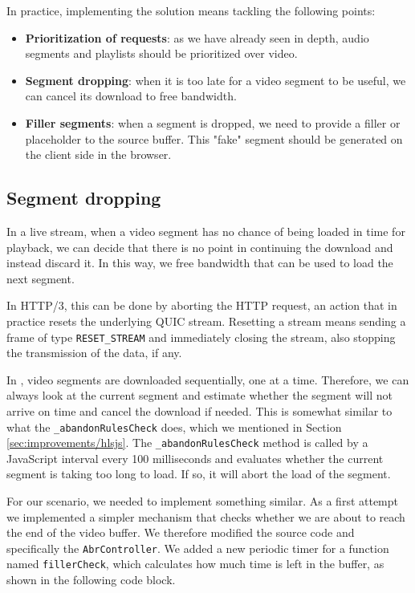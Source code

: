In practice, implementing the solution means tackling the following points:

\begin{itemize}
    \item \textbf{Prioritization of requests}: as we have already seen in depth, audio segments and playlists should be prioritized over video.
    \item \textbf{Segment dropping}: when it is too late for a video segment to be useful, we can cancel its download to free bandwidth.
    \item \textbf{Filler segments}: when a segment is dropped, we need to provide a filler or placeholder to the source buffer. This "fake" segment should be generated on the client side in the browser.
\end{itemize}

\subsection{Segment dropping}
\label{sec:improvements/impl/dropping}

In a live stream, when a video segment has no chance of being loaded in time for playback, we can decide that there is no point in continuing the download and instead discard it. In this way, we free bandwidth that can be used to load the next segment.

In HTTP/3, this can be done by aborting the HTTP request, an action that in practice resets the underlying QUIC stream. Resetting a stream means sending a frame of type \texttt{RESET\_STREAM} and immediately closing the stream, also stopping the transmission of the data, if any.

In \hlsjs{}, video segments are downloaded sequentially, one at a time. Therefore, we can always look at the current segment and estimate whether the segment will not arrive on time and cancel the download if needed. This is somewhat similar to what the \texttt{\_abandonRulesCheck} does, which we mentioned in Section \ref{sec:improvements/hlsjs}. The \texttt{\_abandonRulesCheck} method is called by a JavaScript interval every 100 milliseconds and evaluates whether the current segment is taking too long to load. If so, it will abort the load of the segment.

For our scenario, we needed to implement something similar. As a first attempt we implemented a simpler mechanism that checks whether we are about to reach the end of the video buffer. We therefore modified the \hlsjs{} source code and specifically the \texttt{AbrController}. We added a new periodic timer for a function named \texttt{fillerCheck}, which calculates how much time is left in the buffer, as shown in the following code block.

